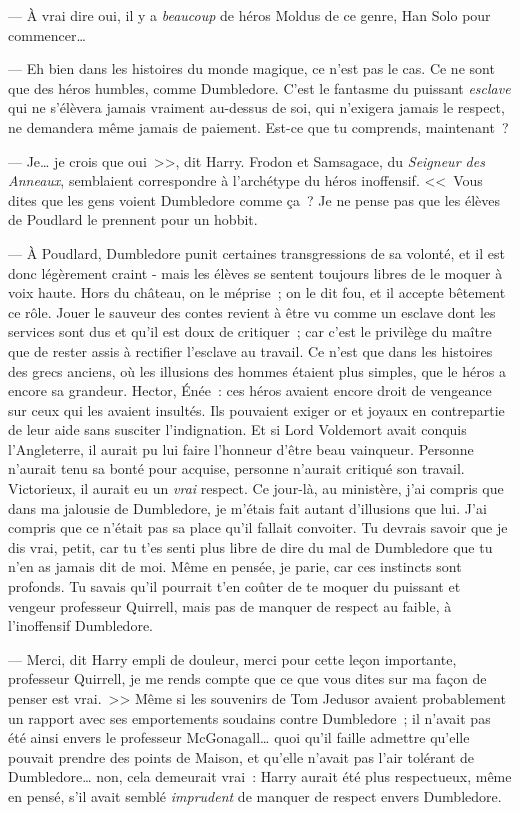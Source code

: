 --- À vrai dire oui, il y a \emph{beaucoup} de héros Moldus de ce genre, Han Solo pour commencer…

--- Eh bien dans les histoires du monde magique, ce n'est pas le cas. Ce ne sont que des héros humbles, comme Dumbledore. C'est le fantasme du puissant \emph{esclave} qui ne s'élèvera jamais vraiment au-dessus de soi, qui n'exigera jamais le respect, ne demandera même jamais de paiement. Est-ce que tu comprends, maintenant~?

--- Je… je crois que oui~>>, dit Harry. Frodon et Samsagace, du \emph{Seigneur des Anneaux}, semblaient correspondre à l'archétype du héros inoffensif. <<~Vous dites que les gens voient Dumbledore comme ça~? Je ne pense pas que les élèves de Poudlard le prennent pour un hobbit.

--- À Poudlard, Dumbledore punit certaines transgressions de sa volonté, et il est donc légèrement craint - mais les élèves se sentent toujours libres de le moquer à voix haute. Hors du château, on le méprise~; on le dit fou, et il accepte bêtement ce rôle. Jouer le sauveur des contes revient à être vu comme un esclave dont les services sont dus et qu'il est doux de critiquer~; car c'est le privilège du maître que de rester assis à rectifier l'esclave au travail. Ce n'est que dans les histoires des grecs anciens, où les illusions des hommes étaient plus simples, que le héros a encore sa grandeur. Hector, Énée~: ces héros avaient encore droit de vengeance sur ceux qui les avaient insultés. Ils pouvaient exiger or et joyaux en contrepartie de leur aide sans susciter l'indignation. Et si Lord Voldemort avait conquis l'Angleterre, il aurait pu lui faire l'honneur d'être beau vainqueur. Personne n'aurait tenu sa bonté pour acquise, personne n'aurait critiqué son travail. Victorieux, il aurait eu un \emph{vrai} respect. Ce jour-là, au ministère, j'ai compris que dans ma jalousie de Dumbledore, je m'étais fait autant d'illusions que lui. J'ai compris que ce n'était pas sa place qu'il fallait convoiter. Tu devrais savoir que je dis vrai, petit, car tu t'es senti plus libre de dire du mal de Dumbledore que tu n'en as jamais dit de moi. Même en pensée, je parie, car ces instincts sont profonds. Tu savais qu'il pourrait t'en coûter de te moquer du puissant et vengeur professeur Quirrell, mais pas de manquer de respect au faible, à l'inoffensif Dumbledore.

--- Merci, dit Harry empli de douleur, merci pour cette leçon importante, professeur Quirrell, je me rends compte que ce que vous dites sur ma façon de penser est vrai.~>> Même si les souvenirs de Tom Jedusor avaient probablement un rapport avec ses emportements soudains contre Dumbledore~; il n'avait pas été ainsi envers le professeur McGonagall… quoi qu'il faille admettre qu'elle pouvait prendre des points de Maison, et qu'elle n'avait pas l'air tolérant de Dumbledore… non, cela demeurait vrai~: Harry aurait été plus respectueux, même en pensé, s'il avait semblé \emph{imprudent} de manquer de respect envers Dumbledore.

